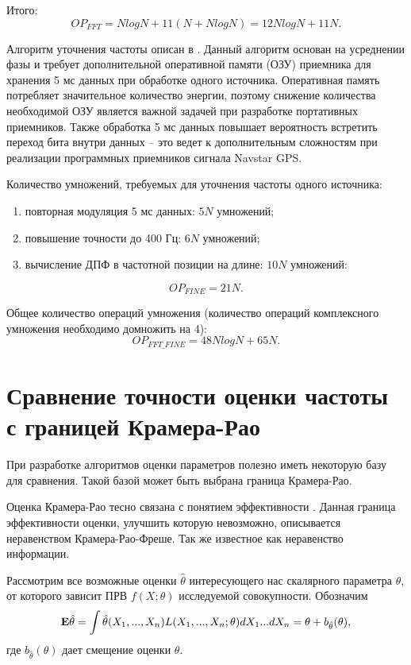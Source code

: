 Итого:
\begin{equation}
	\label{eq:op_fft}
	OP_{FFT} = NlogN + 11(N + NlogN) = 12NlogN + 11N.
\end{equation}

Алгоритм уточнения частоты описан в \cite{tsui}. Данный алгоритм основан на усреднении фазы и требует дополнительной оперативной памяти (ОЗУ) приемника для
хранения 5 мс данных при обработке одного источника. Оперативная память потребляет значительное количество энергии, поэтому снижение количества
необходимой ОЗУ является важной задачей при разработке портативных приемников. Также обработка 5 мс данных повышает вероятность встретить переход бита
внутри данных – это ведет к дополнительным сложностям при реализации программных приемников сигнала Navstar GPS.

Количество умножений, требуемых для уточнения частоты одного источника:
\begin{enumerate}
\item повторная модуляция 5 мс данных: ${5N}$ умножений;
\item повышение точности до 400 Гц: ${6N}$ умножений;
\item вычисление ДПФ в частотной позиции на длине: ${10N}$ умножений:
\end{enumerate}
\begin{equation}
	\label{eq:op_fine}
	OP_{FINE} = 21N.
\end{equation}

Общее количество операций умножения (количество операций комплексного умножения необходимо домножить на 4):
\begin{equation}
	\label{eq:op_fine_fft}
	OP_{FFT\_FINE} = 48NlogN + 65N.
\end{equation}

\section{Сравнение точности оценки частоты с границей Крамера-Рао}
При разработке алгоритмов оценки параметров полезно иметь некоторую базу для сравнения. Такой базой может быть выбрана граница Крамера-Рао.

Оценка Крамера-Рао тесно связана с понятием эффективности . Данная граница эффективности оценки, улучшить которую невозможно, описывается
неравенством Крамера-Рао-Фреше. Так же известное как неравенство информации.

Рассмотрим все возможные оценки ${\hat{\theta}}$ интересующего нас скалярного параметра ${\theta}$, от которого зависит ПРВ ${f(X; \theta)}$
исследуемой совокупности. Обозначим
\begin{equation}
	\label{eq:clrb_mean}
	{\bf{E}} \hat{\theta} = \int \hat{\theta} (X_1, ..., X_n)L(X_1, ..., X_n; \theta) dX_1 ... dX_n= \theta + b_{\hat{\theta}}(\theta),
\end{equation}
где ${b_{\hat{\theta}}(\theta)}$ дает смещение оценки ${\theta}$.

